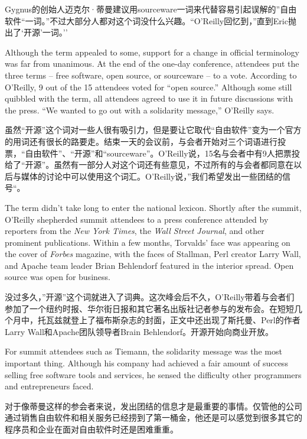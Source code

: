 \ifdefined\chs
Gygnus的创始人迈克尔·蒂曼建议用sourceware一词来代替容易引起误解的''自由软件``一词。''不过大部分人都对这个词没什么兴趣。``O'Reilly回忆到，''直到Eric抛出了`开源'一词。''
\fi

\ifdefined\eng
Although the term appealed to some, support for a change in official terminology was far from unanimous. At the end of the one-day conference, attendees put the three terms -- free software, open source, or sourceware -- to a vote. According to O'Reilly, 9 out of the 15 attendees voted for ``open source.'' Although some still quibbled with the term, all attendees agreed to use it in future discussions with the press. ``We wanted to go out with a solidarity message,'' O'Reilly says.
\fi

\ifdefined\chs
虽然``开源''这个词对一些人很有吸引力，但是要让它取代``自由软件''变为一个官方的用词还有很长的路要走。结束一天的会议前，与会者开始对三个词语进行投票，``自由软件''、``开源''和``sourceware''。O'Reilly说，15名与会者中有9人把票投给了``开源''。虽然有一部分人对这个词还有些意见，不过所有的与会者都同意在以后与媒体的讨论中可以使用这个词汇。O'Reilly说，''我们希望发出一些团结的信号``。
\fi

\ifdefined\eng
The term didn't take long to enter the national lexicon. Shortly after the summit, O'Reilly shepherded summit attendees to a press conference attended by reporters from the \textit{New York Times}, the \textit{Wall Street Journal}, and other prominent publications. Within a few months, Torvalds' face was appearing on the cover of \textit{Forbes} magazine, with the faces of Stallman, Perl creator Larry Wall, and Apache team leader Brian Behlendorf featured in the interior spread. Open source was open for business.
\fi

\ifdefined\chs
没过多久，''开源''这个词就进入了词典。这次峰会后不久，O'Reilly带着与会者们参加了一个纽约时报、华尔街日报和其它著名出版社记者参与的发布会。在短短几个月中，托瓦兹就登上了福布斯杂志的封面，正文中还出现了斯托曼、Perl的作者Larry Wall和Apache团队领导者Brain Behlendorf。开源开始向商业开放。
\fi

\ifdefined\eng
For summit attendees such as Tiemann, the solidarity message was the most important thing. Although his company had achieved a fair amount of success selling free software tools and services, he sensed the difficulty other programmers and entrepreneurs faced.
\fi

\ifdefined\chs
对于像蒂曼这样的参会者来说，发出团结的信息才是最重要的事情。仅管他的公司通过销售自由软件和相关服务已经捞到了第一桶金，他还是可以感觉到很多其它的程序员和企业在面对自由软件时还是困难重重。
\fi


